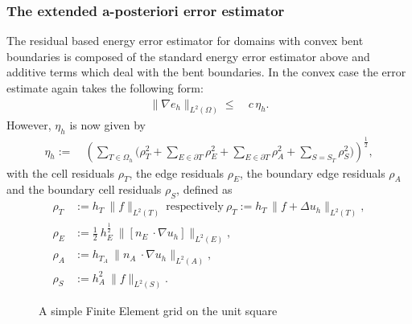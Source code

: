\documentclass[a4paper, 11pt, twoside]{article}
\begin{document}
\subsubsection{The extended a-posteriori error estimator}\label{estimator}
The residual based energy error estimator for domains with convex bent boundaries is composed of the standard energy error estimator above and additive terms which deal with 
the bent boundaries. In the convex case the error estimate again takes the following form:
\begin{align}
 \| \nabla e_h\|_{L^2(\Omega)} \leq&\ c\, \eta_h.
\end{align}
However, $\eta_h$ is now given by
\begin{align*}
 \eta_h :=&\ \left(\sum_{T\in \Omega_h}\big(\rho_T^2
 + \sum_{E \in \partial T}\rho_E^2 +  \sum_{E \in \partial T}\rho_A^2 + \sum_{S=S_T} \rho_S^2 \big)\right)^{\frac{1}{2}}, 
 \end{align*}
with the cell residuals $\rho_T$, the edge residuals $\rho_E$, the boundary edge residuals $\rho_A$ and the boundary cell residuals $\rho_S$, defined as
\begin{align*}
\rho_{T}&:=h_T\ \| f \|_{L^2(T)}\ \text{respectively}\ \rho_T:=h_T\, \| f + \Delta u_h \|_{L^2(T)},\\
\rho_{E}&:=\frac{1}{2}\ h_E^{\frac{1}{2}}\ \|[n_{E}\ \cdot \nabla u_h]\|_{L^2(E)},\\
\rho_{A}&:= h_{T_A}\ \|n_{A}\ \cdot \nabla u_h\|_{L^2(A)},\\
\rho_{S}&:= h_A^2\ \|f\|_{L^2(S)}.
\end{align*}
\begin{figure}[!htbp]
 \centering
{}
\caption{A simple Finite Element grid on the unit square}
\label{fig:fehlersch}
\end{figure}
\end{document}
